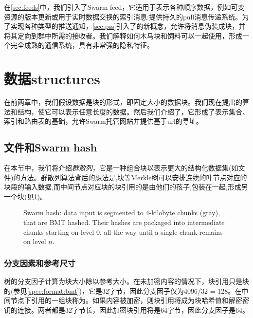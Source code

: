 在\ref{sec:feeds}中，我们引入了Swarm feed，它适用于表示各种顺序数据，例如可变资源的版本更新或用于实时数据交换的索引消息:提供持久的pull消息传递系统。为了实现各种类型的推送通知，\ref{sec:pss}引入了的新概念，允许将消息伪装成块，并将其定向到群中所需的接收者。我们解释如何木马块和饲料可以一起使用，形成一个完全成熟的通信系统，具有非常强的隐私特征。                                                       

\section{数据structures\statusgreen}\label{sec:datastructures}

\green{}

在前两章中，我们假设数据是块的形式，即固定大小的数据块。我们现在提出的算法和结构，使它可以表示任意长度的数据。然后我们介绍了，它形成了表示集合、索引和路由表的基础，允许Swarm托管网站并提供基于url的寻址。

\subsection{文件和Swarm hash\statusgreen}\label{sec:files}

在本节中，我们将介绍\emph{群散列}，它是一种组合块以表示更大的结构化数据集(如文件)的方法。群散列算法背后的想法是,块等Merkle树可以安排连续的叶节点对应的块段的输入数据,而中间节点对应块的块引用的是由他们的孩子,包装在一起,形成另一个块(见\ref{fig:Swarm-hash})。 



\begin{figure}[htbp]
\centering
\resizebox{1\textwidth}{!}{
    
}
\caption[Swarm hash \statusgreen]{Swarm hash: data input is segmented to 4-kilobyte chunks (gray), that are BMT hashed. Their hashes are packaged into intermediate chunks starting on level $0$, all the way until a single chunk remains on level $n$. }
\label{fig:Swarm-hash}
\end{figure}

\subsubsection{分支因素和参考尺寸}

树的分支因子计算为块大小除以参考大小。在未加密内容的情况下，块引用只是块的(参见\ref{spec:format:bmt})，它是32字节，因此分支因子仅为4096/32 = 128。在中间节点下引用的一组块称为。如果内容被加密，则块引用将成为块哈希值和解密密钥的连接。两者都是32字节长，因此加密块引用将是64字节，因此分支因子是64。 


